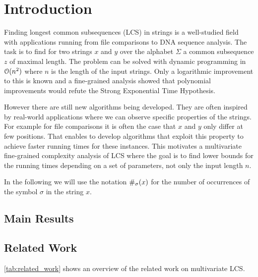 \section{Introduction}
Finding longest common subsequences (LCS) in strings is a well-studied field with applications running from file comparisons to DNA sequence analysis.
The task is to find for two strings $x$ and $y$ over the alphabet $\Sigma$ a common subsequence $z$ of maximal length.
The problem can be solved with dynamic programming in $\mathcal{O}(n^2)$ where $n$ is the length of the input strings.
Only a logarithmic improvement to this is known and a fine-grained analysis showed that polynomial improvements would refute the Strong Exponential Time Hypothesis.

However there are still new algorithms being developed.
They are often inspired by real-world applications where we can observe specific properties of the strings.
For example for file comparisons it is often the case that $x$ and $y$ only differ at few positions.
That enables to develop algorithms that exploit this property to achieve faster running times for these instances.
This motivates a multivariate fine-grained complexity analysis of LCS where the goal is to find lower bounds for the running times depending on a set of parameters, not only the input length $n$.

In the following we will use the notation $\#_{\sigma}(x)$ for the number of occurrences of the symbol $\sigma$ in the string $x$.


\subsection{Main Results}


\subsection{Related Work}

\autoref{tab:related_work} shows an overview of the related work on multivariate LCS.

